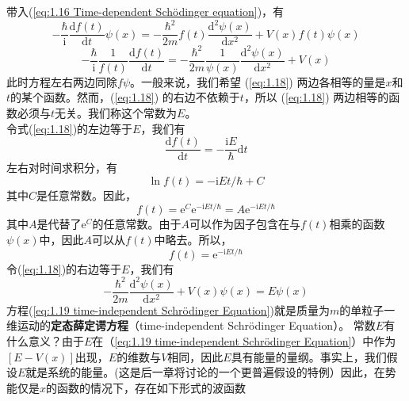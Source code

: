 	带入(\ref{eq:1.16 Time-dependent Schödinger equation})，有
	\begin{equation*}
		-\frac{\hbar}{\mathrm{i}}\frac{\mathrm{d}f\left(t\right)}{\mathrm{d}t}\psi\left(x\right)=-\frac{\hbar^2}{2m}f\left(t\right)\frac{\mathrm{d}^2\psi\left(x\right)}{\mathrm{d}x^2}+V\left(x\right)f\left(t\right)\psi\left(x\right)
	\end{equation*}
	\begin{equation}
			-\frac{\hbar}{\mathrm{i}}\frac{1}{f\left(t\right)}\frac{\mathrm{d}f\left(t\right)}{\mathrm{d}t}=-\frac{\hbar^2}{2m}\frac{1}{\psi\left(x\right)}\frac{\mathrm{d}^2\psi\left(x\right)}{\mathrm{d}x^2}+V\left(x\right)
			\label{eq:1.18}
	\end{equation}
	此时方程左右两边同除$f\psi$。一般来说，我们希望 (\ref{eq:1.18}) 两边各相等的量是$x$和$t$的某个函数。然而，(\ref{eq:1.18}) 的右边不依赖于$t$，所以 (\ref{eq:1.18}) 两边相等的函数必须与$t$无关。我们称这个常数为$E$。\\
	\indent 令式(\ref{eq:1.18})的左边等于$E$，我们有
	\begin{equation*}
		\frac{\mathrm{d}f\left(t\right)}{\mathrm{d}t}=-\frac{\mathrm{i}E}{\hbar}\mathrm{d}t
	\end{equation*}
	左右对时间求积分，有
	\begin{equation*}
		\ln f\left(t\right)= - \mathrm{i}Et/\hbar+C
	\end{equation*}
	其中$C$是任意常数。因此，
	\begin{equation*}
		f\left(t\right)=\mathrm{e}^C\mathrm{e}^{-\mathrm{i}Et/\hbar}=A\mathrm{e}^{-\mathrm{i}Et/\hbar}
	\end{equation*}
	其中$A$是代替了$\mathrm{e}^C$的任意常数。由于$A$可以作为因子包含在与$f\left(t\right)$相乘的函数$\psi\left(x\right)$中，因此$A$可以从$f\left(t\right)$中略去。所以，
	\begin{equation*}
		f\left(t\right)=\mathrm{e}^{-\mathrm{i}Et/\hbar}
	\end{equation*}
	\indent 令(\ref{eq:1.18})的右边等于$E$，我们有
	\begin{equation}
		\boxed{-\frac{\hbar^2}{2m}\frac{\mathrm{d}^2\psi\left(x\right)}{\mathrm{d}x^2}+V\left(x\right)\psi\left(x\right)=E\psi\left(x\right)}
		\label{eq:1.19 time-independent Schrödinger Equation}
	\end{equation}
	方程(\ref{eq:1.19 time-independent Schrödinger Equation})就是质量为$m$的单粒子一维运动的\textbf{定态薛定谔方程}（time-independent Schrödinger Equation）。	常数$E$有什么意义？由于$E$在（\ref{eq:1.19 time-independent Schrödinger Equation}）中作为$\left[E-V\left(x\right)\right]$出现，$E$的维数与$V$相同，因此$E$具有能量的量纲。事实上，我们假设$E$就是系统的能量。(这是后一章将讨论的一个更普遍假设的特例）因此，在势能仅是$x$的函数的情况下，存在如下形式的波函数
